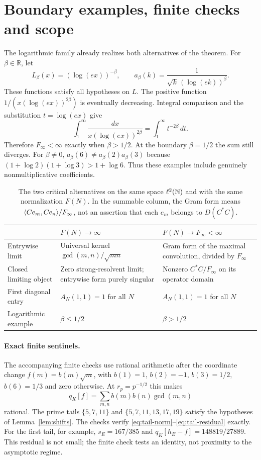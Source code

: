 \section{Boundary examples, finite checks and scope}
\label{sec:examples}

The logarithmic family already realizes both alternatives of the theorem.
For $\beta\in\mathbb R$, let
\[
 L_\beta(x)=(\log(ex))^{-\beta},\qquad
 a_\beta(k)=\frac{1}{\sqrt{k}\,(\log(ek))^\beta}.
\]
These functions satisfy all hypotheses on $L$.
The positive function $1/(x(\log(ex))^{2\beta})$ is eventually decreasing.
Integral comparison and the substitution $t=\log(ex)$ give
\[
 \int_1^\infty\frac{dx}{x(\log(ex))^{2\beta}}
 =\int_1^\infty t^{-2\beta}\,dt.
\]
Therefore $F_\infty<\infty$ exactly when $\beta>1/2$.
At the boundary $\beta=1/2$ the sum still diverges.
For $\beta\ne0$, $a_\beta(6)\ne a_\beta(2)a_\beta(3)$ because
$(1+\log2)(1+\log3)>1+\log6$. Thus these examples include genuinely
nonmultiplicative coefficients.

\begin{table}[ht]
\centering
\small
\begin{tabularx}{\textwidth}{@{}lXX@{}}
\toprule
 & $F(N)\to\infty$ & $F(N)\to F_\infty<\infty$\\
\midrule
Entrywise limit &
Universal kernel $\gcd(m,n)/\sqrt{mn}$ &
Gram form of the maximal convolution, divided by $F_\infty$\\
Closed limiting object &
Zero strong-resolvent limit; entrywise form purely singular &
Nonzero $C^*C/F_\infty$ on its operator domain\\
First diagonal entry &
$A_N(1,1)=1$ for all $N$ &
$A_N(1,1)=1$ for all $N$\\
Logarithmic example &
$\beta\le1/2$ &
$\beta>1/2$\\
\bottomrule
\end{tabularx}
\caption{The two critical alternatives on the same space $\ell^2(\mathbb{N})$
and with the same normalization $F(N)$. In the summable column,
the Gram form means $\langle Ce_m,Ce_n\rangle/F_\infty$, not an assertion that
each $e_m$ belongs to $D(C^*C)$.}
\label{tab:branches}
\end{table}

\paragraph{Exact finite sentinels.}
The accompanying finite checks use rational arithmetic after the
coordinate change $f(m)=b(m)\sqrt m$, with
$b(1)=1$, $b(2)=-1$, $b(3)=1/2$, $b(6)=1/3$ and zero otherwise.
At $r_p=p^{-1/2}$ this makes
\[
 q_K[f]=\sum_{m,n}b(m)b(n)\gcd(m,n)
\]
rational. The prime tails $\{5,7,11\}$ and
$\{5,7,11,13,17,19\}$ satisfy the hypotheses of
Lemma~\ref{lem:shifts}.
The checks verify \eqref{eq:tail-norm}--\eqref{eq:tail-residual}
exactly. For the first tail, for example,
$s_E=167/385$ and
$q_K[h_E-f]=148819/27889$.
This residual is not small; the finite check tests an identity,
not proximity to the asymptotic regime.

